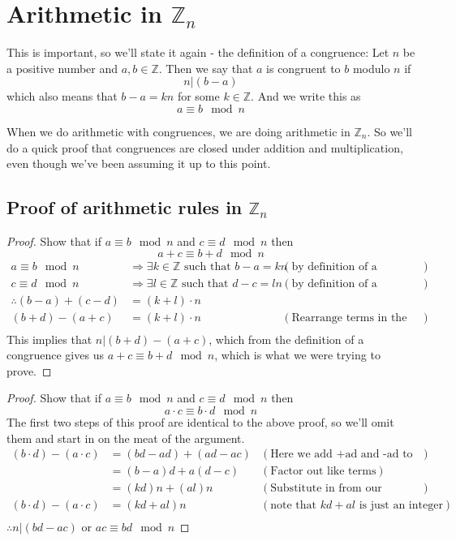 \documentclass[10pt]{article}
\newcommand{\Z}{\mathbb{Z}}
\theoremstyle{definition}
\theoremstyle{remark}
\def\Z{\mathbb{ Z}}
\def\ra{\Rightarrow}
\begin{document}
\section{Arithmetic in $\Z_n$}
This is important, so we'll state it again - the definition of a congruence:  Let $n$ be a positive number and $a,b \in \Z$.  Then we say that $a$ is congruent to $b$ modulo $n$ if $$n|(b-a)$$ which also means that $b-a = kn$ for some $k \in \Z$.  And we write this as $$a\equiv b \mod n$$

When we do arithmetic with congruences, we are doing arithmetic in $\Z_n$.  So we'll do a quick proof that congruences are closed under addition and multiplication, even though we've been assuming it up to this point.
\subsection{Proof of arithmetic rules in $\Z_n$}
\begin{proof}\label{Congruence closure under addition}
Show that if $a\equiv b \mod n$ and $c\equiv d \mod n$ then $$a + c \equiv b + d \mod n$$
\begin{align*}
a\equiv b \mod n &\ra \exists k \in \Z \text{ such that } b-a = kn &(\text{by definition of a congruence})\\
c\equiv d \mod n &\ra \exists l \in \Z \text{ such that } d-c = ln &(\text{by definition of a congruence})\\
\therefore (b-a) + (c-d) &= (k+l)\cdot n\\
(b+d)-(a+c) &= (k+l)\cdot n &(\text{Rearrange terms in the order we want})\\
\end{align*}
This implies that $n|(b+d)-(a+c)$, which from the definition of a congruence gives us $a+c\equiv b+d \mod n$, which is what we were trying to prove.
\end{proof}

\begin{proof}\label{Congruence closure under multiplication}
Show that if $a\equiv b \mod n$ and $c\equiv d \mod n$ then $$a \cdot c \equiv b \cdot d \mod n$$
The first two steps of this proof are identical to the above proof, so we'll omit them and start in on the meat of the argument.
\begin{align*}
(b\cdot d) - (a \cdot c) &= (bd - ad) + (ad - ac) &(\text{Here we add +ad and -ad to the two terms on the right side})\\
&= (b-a)d + a(d-c) &(\text{Factor out like terms})\\
&= (kd)n + (al)n &(\text{Substitute in from our definition and rearrange terms})\\
(b\cdot d) - (a \cdot c) &= (kd + al)n &(\text{note that $kd+al$ is just an integer})\\
\end{align*}
$\therefore n|(bd-ac)$ or $ac \equiv bd \mod n$
\end{proof}
\end{document}
